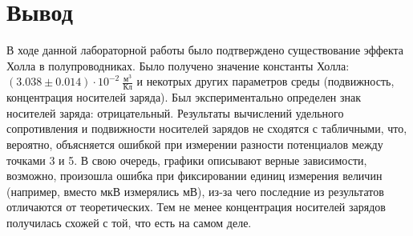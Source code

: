\section{Вывод}

В ходе данной лабораторной работы было подтверждено существование эффекта Холла в полупроводниках. Было получено значение константы Холла: $(3.038 \pm 0.014) \cdot 10^{-2} \ \frac{\text{м}^3}{\text{Кл}}$ и некотрых других параметров среды (подвижность, концентрация носителей заряда). Был экспериментально определен знак носителей заряда: отрицательный. Результаты вычислений удельного сопротивления и подвижности носителей зарядов не сходятся с табличными, что, вероятно, объясняется ошибкой при измерении разности потенциалов между точками 3 и 5. В свою очередь, графики описывают верные зависимости, возможно, произошла ошибка при фиксировании единиц измерения величин (например, вместо мкВ измерялись мВ), из-за чего последние из результатов отличаются от теоретических. Тем не менее концентрация носителей зарядов получилась схожей с той, что есть на самом деле.
